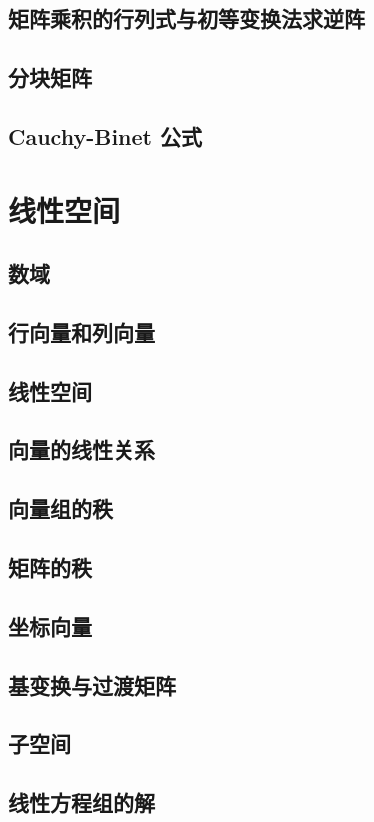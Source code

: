 \documentclass[a4paper, 11pt]{ctexbook}
\begin{document}
        \section{矩阵乘积的行列式与初等变换法求逆阵}
            
        \section{分块矩阵}
        \section{Cauchy-Binet 公式}
    \chapter{线性空间}
        \section{数域}
        \section{行向量和列向量}
        \section{线性空间}
        \section{向量的线性关系}
        \section{向量组的秩}
        \section{矩阵的秩}
        \section{坐标向量}
        \section{基变换与过渡矩阵}
        \section{子空间}
        \section{线性方程组的解}
\end{document}
